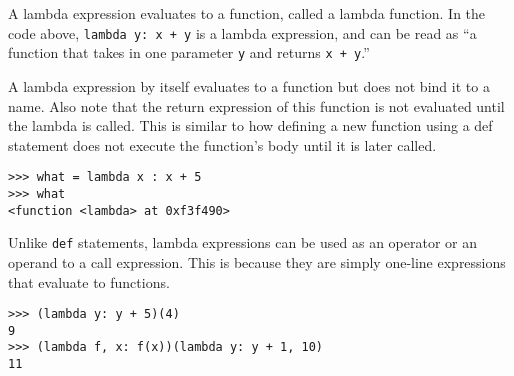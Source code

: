 A lambda expression evaluates to a function, called a lambda function. In the code above, \texttt{lambda y: x + y} is a lambda expression, and can be read as “a function that takes in one parameter \texttt{y} and returns \texttt{x + y}.” 

A lambda expression by itself evaluates to a function but does not bind it to a name. Also note that the return expression of this function is not evaluated until the lambda is called. This is similar to how defining a new function using a def statement does not execute the function’s body until it is later called. 

\begin{lstlisting}[linewidth=\textwidth]
>>> what = lambda x : x + 5
>>> what
<function <lambda> at 0xf3f490>
\end{lstlisting}


Unlike \texttt{def} statements, lambda expressions can be used as an operator or an operand to a call expression. This is because they are simply one-line expressions that evaluate to functions.

\begin{lstlisting}[linewidth=\textwidth]
>>> (lambda y: y + 5)(4) 
9
>>> (lambda f, x: f(x))(lambda y: y + 1, 10)
11
\end{lstlisting}